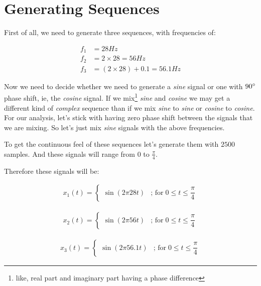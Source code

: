 \documentclass[../../course]{subfiles}
\begin{document}
\def\freqXOne{28}
\def\freqXTwo{56}
\def\freqXThree{56.1}

\section{Generating Sequences} \label{sec:wrkGenSeqs}

First of all, we need to generate three sequences, with frequencies of:

\begin{align}
    f_{1} &= \freqXOne \si{Hz}                                  \label{eqn:freq1} \\
    f_{2} &= 2 \times \freqXOne         = \freqXTwo   \si{Hz}   \label{eqn:freq2} \\
    f_{3} &= (2 \times \freqXOne) + 0.1 = \freqXThree \si{Hz}   \label{eqn:freq3}
\end{align}

Now we need to decide whether we need to generate a \emph{sine} signal or one with
$90 \degree$ phase shift, ie, the \emph{cosine} signal. If we mix\footnote{like, real
part and imaginary part having a phase difference} \emph{sine} and \emph{cosine} we may
get a different kind of \emph{complex} sequence than if we mix \emph{sine} to \emph{sine}
or \emph{cosine} to \emph{cosine}. For our analysis, let's stick with having zero phase
shift between the signals that we are mixing. So let's just mix \emph{sine} signals with
the above frequencies.


To get the continuous feel of these sequences let's generate them with $2500$ samples.
And these signals will range from $0$ to $\frac{\pi}{4}$.


Therefore these signals will be:

\begin{align}
    x_{1}(t) =
    \begin{cases}
        \sin(2 \pi \freqXOne t) & \text{; for} \; 0 \le t \le \dfrac{\pi}{4}
    \end{cases}
    \label{eqn:seqx1}
\end{align}

\begin{align}
    x_{2}(t) =
    \begin{cases}
        \sin(2 \pi \freqXTwo t) & \text{; for} \; 0 \le t \le \dfrac{\pi}{4}
    \end{cases}
    \label{eqn:seqx2}
\end{align}

\begin{align}
    x_{3}(t) =
    \begin{cases}
        \sin(2 \pi \freqXThree t) & \text{; for} \; 0 \le t \le \dfrac{\pi}{4}
    \end{cases}
    \label{eqn:seqx3}
\end{align}
\end{document}
